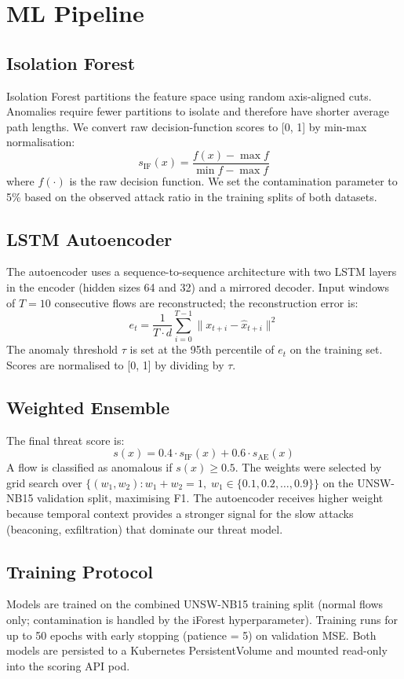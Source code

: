 \section{ML Pipeline}
\label{sec:ml}

\subsection{Isolation Forest}
Isolation Forest partitions the feature space using random axis-aligned cuts.
Anomalies require fewer partitions to isolate and therefore have shorter
average path lengths.
We convert raw decision-function scores to [0, 1] by min-max normalisation:
\begin{equation}
  s_{\text{IF}}(x) = \frac{f(x) - \max f}{\min f - \max f}
  \label{eq:iforest_norm}
\end{equation}
where $f(\cdot)$ is the raw decision function.
We set the contamination parameter to 5\% based on the observed attack
ratio in the training splits of both datasets.

\subsection{LSTM Autoencoder}
The autoencoder uses a sequence-to-sequence architecture with two LSTM
layers in the encoder (hidden sizes 64 and 32) and a mirrored decoder.
Input windows of $T = 10$ consecutive flows are reconstructed; the
reconstruction error is:
\begin{equation}
  e_t = \frac{1}{T \cdot d} \sum_{i=0}^{T-1} \| x_{t+i} - \hat{x}_{t+i} \|^2
  \label{eq:recon_error}
\end{equation}
The anomaly threshold $\tau$ is set at the 95th percentile of $e_t$ on
the training set.
Scores are normalised to [0, 1] by dividing by $\tau$.

\subsection{Weighted Ensemble}
The final threat score is:
\begin{equation}
  s(x) = 0.4 \cdot s_{\text{IF}}(x) + 0.6 \cdot s_{\text{AE}}(x)
  \label{eq:ensemble}
\end{equation}
A flow is classified as anomalous if $s(x) \geq 0.5$.
The weights were selected by grid search over
$\{(w_1, w_2) : w_1 + w_2 = 1,\; w_1 \in \{0.1, 0.2, \ldots, 0.9\}\}$
on the UNSW-NB15 validation split, maximising F1.
The autoencoder receives higher weight because temporal context provides
a stronger signal for the slow attacks (beaconing, exfiltration) that
dominate our threat model.

\subsection{Training Protocol}
Models are trained on the combined UNSW-NB15 training split (normal flows
only; contamination is handled by the iForest hyperparameter).
Training runs for up to 50 epochs with early stopping (patience = 5) on
validation MSE.
Both models are persisted to a Kubernetes PersistentVolume and mounted
read-only into the scoring API pod.
